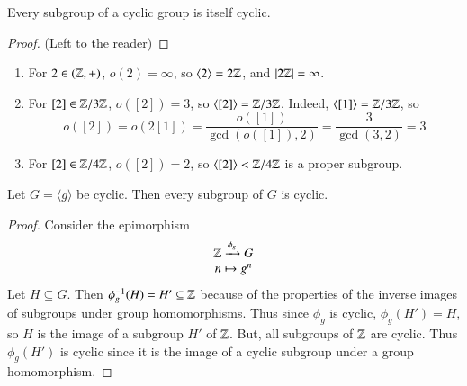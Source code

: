 \documentclass[12pt, a4paper, oneside, openright, titlepage]{book}
\begin{document}
\begin{thm}
    Every subgroup of a cyclic group is itself cyclic.
    \begin{proof}
        (Left to the reader)
    \end{proof}
\end{thm}

\begin{eg}
    \leavevmode
    \begin{enumerate}
        \item For $2 \in (
        \mathbb Z,+)$, $o(2) = \infty$, so $\langle 2 \rangle = 2\mathbb Z$, and $|2\mathbb Z| = \infty$.
        \item For $[2] \in \mathbb Z/3\mathbb Z$, $o([2]) = 3$, so $\langle [2]\rangle = \mathbb Z/3\mathbb Z$. Indeed, $\langle [1]\rangle = \mathbb Z/3\mathbb Z$, so $$o([2]) = o(2[1]) = \frac{o([1])}{\gcd(o([1]),2)} = \frac{3}{\gcd(3,2)} = 3$$
        \item For $[2] \in \mathbb Z/4\mathbb Z$, $o([2]) = 2$, so $\langle [2] \rangle < \mathbb Z/4\mathbb Z$ is a proper subgroup.
    \end{enumerate}
\end{eg}


\begin{cor}
        Let $G = \langle g \rangle$ be cyclic. Then every subgroup of $G$ is cyclic.
\end{cor}
\begin{proof}
        Consider the epimorphism \begin{equation}
                \begin{array}{c} \mathbb Z\xrightarrow{\phi_g}G \\ n\mapsto g^n \end{array}
        \end{equation}
        Let $H \subseteq G$. Then $\phi^{-1}_g(H) = H' \subseteq \mathbb Z$ because of the properties of the inverse images of subgroups under group homomorphisms. Thus since $\phi_g$ is cyclic, $\phi_g(H') = H$, so $H$ is the image of a subgroup $H'$ of $\mathbb Z$. But, all subgroups of $\mathbb Z$ are cyclic. Thus $\phi_g(H')$ is cyclic since it is the image of a cyclic subgroup under a group homomorphism.
\end{proof}
\end{document}
